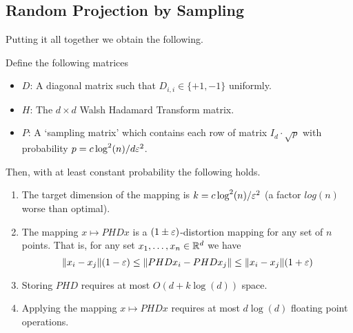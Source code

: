 \documentclass{article}
\begin{document}
\subsection{Random Projection by Sampling}
Putting it all together we obtain the following.
\begin{lemma}
Define the following matrices
\begin{itemize}
\item $D$: A diagonal matrix such that $D_{i,i} \in \{+1,-1\}$ uniformly.
\item $H$: The $d\times d$ Walsh Hadamard Transform matrix.
\item $P$: A `sampling matrix' which contains each row of matrix $I_d\cdot \sqrt{p}$ with probability $p= c\log^2(n)/d\varepsilon^2$.
\end{itemize}
Then, with at least constant probability the following holds.
\begin{enumerate}
\item The target dimension of the mapping is $k = c\log^2(n)/\varepsilon^2$ (a factor $log(n)$ worse than optimal).
\item The mapping $x \mapsto PHDx$ is a $(1\pm\varepsilon)$-distortion mapping for any set of $n$ points. 
That is, for any set $x_1,\ldots,x_n \in {\mathbb{R}}^d$ we have
\[
\|x_i -x_j\|(1-\varepsilon) \le \|PHDx_i  - PHDx_j\| \le \|x_i -x_j\|(1+\varepsilon)
\]
\item Storing $PHD$ requires at most $O(d + k\log(d))$ space.
\item Applying the mapping $x \mapsto PHDx$ requires at most $d\log(d)$ floating point operations.
\end{enumerate}
\end{lemma}




\end{document}
